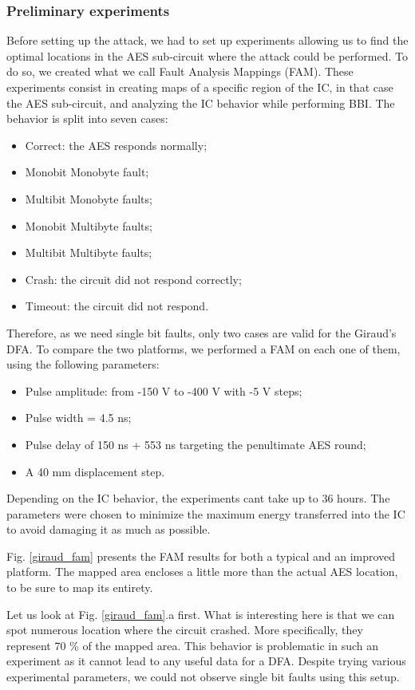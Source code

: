 		\subsubsection{Preliminary experiments}
			Before setting up the attack, we had to set up experiments allowing us to find the optimal locations in the AES sub-circuit where the attack could be performed.
			To do so, we created what we call Fault Analysis Mappings (FAM).
			These experiments consist in creating maps of a specific region of the IC, in that case the AES sub-circuit, and analyzing the IC behavior while performing BBI.
			The behavior is split into seven cases:
			\begin{itemize}
				\item Correct: the AES responds normally;
				\item Monobit Monobyte fault;
				\item Multibit Monobyte faults;
				\item Monobit Multibyte faults;
				\item Multibit Multibyte faults;
				\item Crash: the circuit did not respond correctly;
				\item Timeout: the circuit did not respond.
			\end{itemize}
			Therefore, as we need single bit faults, only two cases are valid for the Giraud's DFA.
			To compare the two platforms, we performed a FAM on each one of them, using the following parameters:
			\begin{itemize}
				\item Pulse amplitude: from -150 V to -400 V with -5 V steps;
				\item Pulse width = 4.5 ns;
				\item Pulse delay of 150 ns + 553 ns targeting the penultimate AES round;
				\item A 40 mm displacement step.
			\end{itemize}
			Depending on the IC behavior, the experiments cant take up to 36 hours.
			The parameters were chosen to minimize the maximum energy transferred into the IC to avoid damaging it as much as possible.
			
			Fig. \ref{giraud_fam} presents the FAM results for both a typical and an improved platform.
			The mapped area encloses a little more than the actual AES location, to be sure to map its entirety.

			Let us look at Fig. \ref{giraud_fam}.a first.
			What is interesting here is that we can spot numerous location where the circuit crashed.
			More specifically, they represent 70 \% of the mapped area.
			This behavior is problematic in such an experiment as it cannot lead to any useful data for a DFA.
			Despite trying various experimental parameters, we could not observe single bit faults using this setup.

